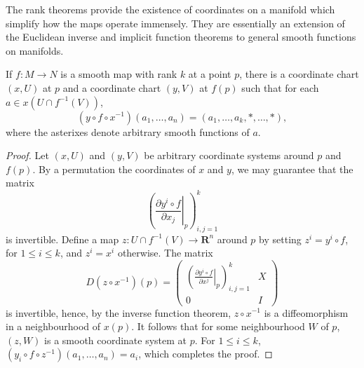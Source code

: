 The rank theorems provide the existence of coordinates on a manifold which simplify how the maps operate immensely. They are essentially an extension of the Euclidean inverse and implicit function theorems to general smooth functions on manifolds.

\begin{theorem}
    If $f: M \to N$ is a smooth map with rank $k$ at a point $p$, there is a coordinate chart $(x,U)$ at $p$ and a coordinate chart $(y,V)$ at $f(p)$ such that for each $a \in x(U \cap f^{-1}(V))$,
    \[ (y \circ f \circ x^{-1})(a_1,\dots,a_n) = (a_1,\dots,a_k,*,\dots,*), \]
    where the asterixes denote arbitrary smooth functions of $a$.
\end{theorem}
\begin{proof}
    Let $(x,U)$ and $(y,V)$ be arbitrary coordinate systems around $p$ and $f(p)$. By a permutation the coordinates of $x$ and $y$, we may guarantee that the matrix
    \[ \left( \left.\frac{\partial y^i \circ f}{\partial x_j}\right|_p \right)_{i,j = 1}^k \]
    is invertible. Define a map $z:U \cap f^{-1}(V) \to \mathbf{R}^n$ around $p$ by setting $z^i = y^i \circ f$, for $1 \leq i \leq k$, and $z^i = x^i$ otherwise. The matrix
    \[ D(z \circ x^{-1})(p) = \begin{pmatrix} \left( \left.\frac{\partial y^i \circ f}{\partial x^j}\right|_p \right)_{i,j = 1}^k & X \\ 0 & I \end{pmatrix} \]
    is invertible, hence, by the inverse function theorem, $z \circ x^{-1}$ is a diffeomorphism in a neighbourhood of $x(p)$. It follows that for some neighbourhood $W$ of $p$, $(z,W)$ is a smooth coordinate system at $p$. For $1 \leq i \leq k$, $(y_i \circ f \circ z^{-1})(a_1,\dots, a_n) = a_i$, which completes the proof.
\end{proof}

